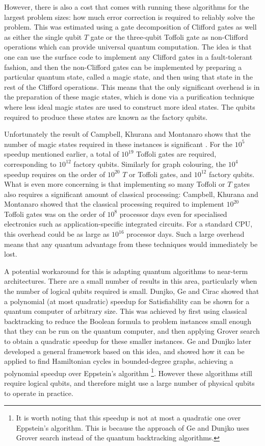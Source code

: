 However, there is also a cost that comes with running these algorithms for the largest problem sizes: how much error correction is required to reliably solve the problem. This was estimated using a gate decomposition of Clifford gates as well as either the single qubit $T$ gate or the three-qubit Toffoli gate as non-Clifford operations which can provide universal quantum computation. The idea is that one can use the surface code to implement any Clifford gates in a fault-tolerant fashion, and then the non-Clifford gates can be implemented by preparing a particular quantum state, called a magic state, and then using that state in the rest of the Clifford operations. This means that the only significant overhead is in the preparation of these magic states, which is done via a purification technique where less ideal magic states are used to construct more ideal states. The qubits required to produce these states are known as the factory qubits.

Unfortunately the result of Campbell, Khurana and Montanaro shows that the number of magic states required in these instances is significant \cite{campbell2019}. For the $10^5$ speedup mentioned earlier, a total of $10^{19}$ Toffoli gates are required, corresponding to $10^{12}$ factory qubits. Similarly for graph colouring, the $10^4$ speedup requires on the order of $10^{20}$ $T$ or Toffoli gates, and $10^{12}$ factory qubits. What is even more concerning is that implementing so many Toffoli or $T$ gates also requires a significant amount of classical processing: Campbell, Khurana and Montanaro showed that the classical processing required to implement $10^{20}$ Toffoli gates was on the order of $10^8$ processor days even for specialised electronics such as application-specific integrated circuits. For a standard CPU, this overhead could be as large as $10^{16}$ processor days. Such a large overhead means that any quantum advantage from these techniques would immediately be lost.

A potential workaround for this is adapting quantum algorithms to near-term architectures. There are a small number of results in this area, particularly when the number of logical qubits required is small. Dunjko, Ge and Cirac \cite{dunjko2018} showed that a polynomial (at most quadratic) speedup for Satisfiability can be shown for a quantum computer of arbitrary size. This was achieved by first using classical backtracking to reduce the Boolean formula to problem instances small enough that they can be run on the quantum computer, and then applying Grover search to obtain a quadratic speedup for these smaller instances. Ge and Dunjko \cite{ge2019} later developed a general framework based on this idea, and showed how it can be applied to find Hamiltonian cycles in bounded-degree graphs, achieving a polynomial speedup over Eppstein's algorithm \cite{eppstein2007}\footnote{It is worth noting that this speedup is not at most a quadratic one over Eppstein's algorithm. This is because the approach of Ge and Dunjko uses Grover search instead of the quantum backtracking algorithms.}. However these algorithms still require logical qubits, and therefore might use a large number of physical qubits to operate in practice.


